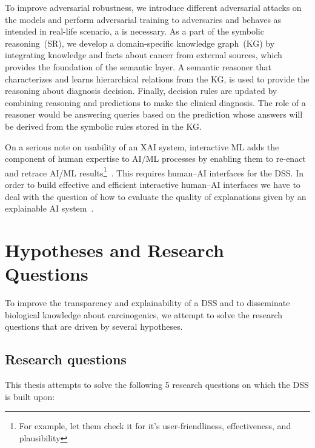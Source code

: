 \hspace*{3.5mm} To improve adversarial robustness, we introduce different adversarial attacks on the models and perform adversarial training to adversaries and behaves as intended in real-life scenario, a is necessary. As a part of the symbolic reasoning~(SR), we develop a domain-specific knowledge graph~(KG) by integrating knowledge and facts about cancer from external sources, which provides the foundation of the semantic layer. A semantic reasoner that characterizes and learns hierarchical relations from the KG, is used to provide the reasoning about diagnosis decision. 
Finally, decision rules are updated by combining reasoning and predictions to make the clinical diagnosis. The role of a reasoner would be answering queries based on the prediction whose answers will be derived from the symbolic rules stored in the KG.  

\hspace*{3.5mm} On a serious note on usability of an XAI system, interactive ML adds the component of human expertise to AI/ML processes by enabling them to re-enact and retrace AI/ML results\footnote{For example, let them check it for it's user-friendliness, effectiveness, and plausibility}~\cite{holzinger2020measuring}. This requires human–AI interfaces for the DSS. In order to build effective and efficient interactive human–AI interfaces we have to deal with the question of how to evaluate the quality of explanations given by an explainable AI system~\cite{holzinger2020measuring}. 

\section{Hypotheses and Research Questions} \label{hypotheses}
To improve the transparency and explainability of a DSS and to disseminate biological knowledge about carcinogenics, we attempt to solve the research questions that are driven by several hypotheses.  

\subsection{Research questions}
This thesis attempts to solve the following 5 research questions on which the DSS is built upon:  

